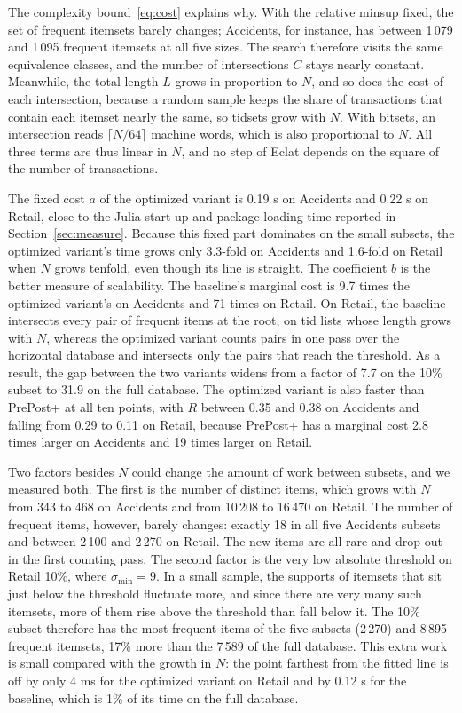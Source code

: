 The complexity bound~\eqref{eq:cost} explains why. With the relative minsup fixed, the
set of frequent itemsets barely changes; Accidents, for instance, has between 1\,079 and
1\,095 frequent itemsets at all five sizes. The search therefore visits the same
equivalence classes, and the number of intersections $C$ stays nearly constant.
Meanwhile, the total length $L$ grows in proportion to $N$, and so does the cost of each
intersection, because a random sample keeps the share of transactions that contain each
itemset nearly the same, so tidsets grow with $N$. With bitsets, an intersection reads
$\lceil N/64 \rceil$ machine words, which is also proportional to $N$. All three terms are
thus linear in $N$, and no step of Eclat depends on the square of the number of
transactions.

The fixed cost $a$ of the optimized variant is 0.19 s on Accidents and 0.22 s on Retail,
close to the Julia start-up and package-loading time reported in Section~\ref{sec:measure}.
Because this fixed part dominates on the small subsets, the optimized variant's time grows
only 3.3-fold on Accidents and 1.6-fold on Retail when $N$ grows tenfold, even though its
line is straight. The coefficient $b$ is the better measure of scalability. The baseline's
marginal cost is 9.7 times the optimized variant's on Accidents and 71 times on Retail. On
Retail, the baseline intersects every pair of frequent items at the root, on tid lists
whose length grows with $N$, whereas the optimized variant counts pairs in one pass over
the horizontal database and intersects only the pairs that reach the threshold. As a
result, the gap between the two variants widens from a factor of 7.7 on the 10\% subset
to 31.9 on the full database. The optimized variant is also faster than PrePost+ at all
ten points, with $R$ between 0.35 and 0.38 on Accidents and falling from 0.29 to 0.11 on
Retail, because PrePost+ has a marginal cost 2.8 times larger on Accidents and 19 times
larger on Retail.

Two factors besides $N$ could change the amount of work between subsets, and we measured
both. The first is the number of distinct items, which grows with $N$ from 343 to 468 on
Accidents and from 10\,208 to 16\,470 on Retail. The number of frequent items, however,
barely changes: exactly 18 in all five Accidents subsets and between 2\,100 and 2\,270 on
Retail. The new items are all rare and drop out in the first counting pass. The second
factor is the very low absolute threshold on Retail 10\%, where $\sigma_{\min} = 9$. In a
small sample, the supports of itemsets that sit just below the threshold fluctuate more,
and since there are very many such itemsets, more of them rise above the threshold than
fall below it. The 10\% subset therefore has the most frequent items of the five subsets
(2\,270) and 8\,895 frequent itemsets, 17\% more than the 7\,589 of the full database.
This extra work is small compared with the growth in $N$: the point farthest from the
fitted line is off by only 4 ms for the optimized variant on Retail and by 0.12 s for the
baseline, which is 1\% of its time on the full database.

